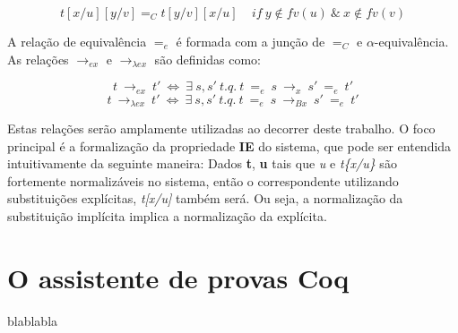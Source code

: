 \[ t[x/u][y/v] =_C t[y/v][x/u] \ \ \ \ \ if\ y \notin fv(u)\ \&\ x \notin fv(v)\] 

A relação de equivalência $=_e$ é formada com a junção de $=_C$ e
$\alpha$-equivalência. As relações $\rightarrow_{ex}$ e $\rightarrow_{\lambda
    ex}$ são definidas como:

\[t\ \rightarrow_{ex}\ t'\ \iff\ \exists\ s,s'\ t.q.\ t\ =_{e}\ s\
    \rightarrow_x\ s'\ =_e\ t' \]
\[t\ \rightarrow_{\lambda ex}\ t'\ \iff\ \exists\ s,s'\ t.q.\ t\ =_{e}\ s\
    \rightarrow_{Bx}\ s'\ =_e\ t' \]

Estas relações serão amplamente utilizadas ao decorrer deste trabalho. 
O foco principal é a formalização da propriedade \textbf{IE} do sistema, que
pode ser entendida intuitivamente da seguinte maneira: Dados \textbf{t},
\textbf{u} tais que \emph{u} e \emph{t\{x/u\}} são fortemente normalizáveis
no sistema, então o correspondente utilizando substituições explícitas,
\emph{t[x/u]} também será. Ou seja, a normalização da substituição implícita
implica a normalização da explícita.


\section{O assistente de provas Coq} 
blablabla
